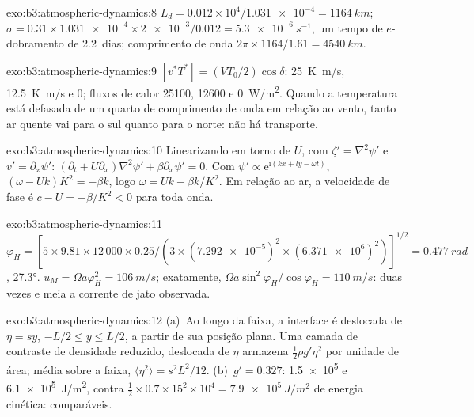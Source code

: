 \begin{solution}{exo:b3:atmospheric-dynamics:8}
$L_d = 0.012\times10^4/\num{1.031e-4} = \qty{1164}{km}$; $\sigma =
0.31\times\num{1.031e-4}\times\num{2e-3}/0.012 = \qty{5.3e-6}{s^{-1}}$, um
tempo de $e$-dobramento de \num{2.2}~dias; comprimento de onda $2\pi\times1164/1.61 =
\qty{4540}{km}$.
\end{solution}

\begin{solution}{exo:b3:atmospheric-dynamics:9}
$[v^*T^*] = (VT_0/2)\cos\delta$: \qty{25}{K.m/s}, \qty{12.5}{K.m/s} e 0;
fluxos de calor \num{25100}, \num{12600} e \qty{0}{W/m^2}. Quando a
temperatura está defasada de um quarto de comprimento de onda em relação ao
vento, tanto ar quente vai para o sul quanto para o norte: não há transporte.
\end{solution}

\begin{solution}{exo:b3:atmospheric-dynamics:10}
Linearizando em torno de $U$, com $\zeta' = \nabla^2\psi'$ e $v' =
\partial_x\psi'$: $(\partial_t + U\partial_x)\nabla^2\psi' + \beta\partial_x
\psi' = 0$. Com $\psi' \propto \mathrm e^{\mathrm i(kx + ly - \omega t)}$,
$(\omega - Uk)K^2 = -\beta k$, logo $\omega = Uk - \beta k/K^2$. Em relação
ao ar, a velocidade de fase é $c - U = -\beta/K^2 < 0$ para toda onda.
\end{solution}

\begin{solution}{exo:b3:atmospheric-dynamics:11}
$\varphi_H = [5\times9.81\times12\,000\times0.25/(3\times(\num{7.292e-5})^2
\times(\num{6.371e6})^2)]^{1/2} = \qty{0.477}{rad}$, \ang{27.3}.
$u_M = \Omega a\varphi_H^2 = \qty{106}{m/s}$; exatamente, $\Omega a\sin^2
\varphi_H/\cos\varphi_H = \qty{110}{m/s}$: duas vezes e meia a
corrente de jato observada.
\end{solution}

\begin{solution}{exo:b3:atmospheric-dynamics:12}
(a)~Ao longo da faixa, a interface é deslocada de $\eta = sy$, $-L/2 \le y
\le L/2$, a partir de sua posição plana. Uma camada de contraste de
densidade reduzido, deslocada de $\eta$ armazena $\tfrac12\rho g'\eta^2$ por unidade de área; média
sobre a faixa, $\langle\eta^2\rangle = s^2L^2/12$. (b)~$g' = 0.327$:
\num{1.5e5} e \qty{6.1e5}{J/m^2}, contra $\tfrac12\times0.7\times15^2
\times10^4 = \qty{7.9e5}{J/m^2}$ de energia cinética: comparáveis.
\end{solution}

